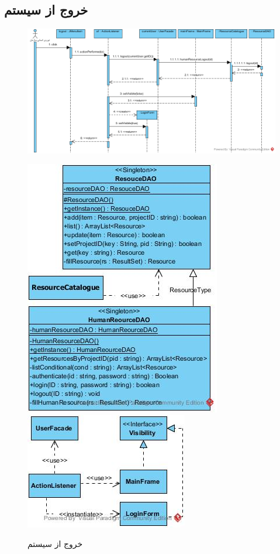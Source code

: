 \begin{landscape}
\section{خروج از سیستم}
\begin{figure}[H]
	\centering
	\includegraphics[scale=0.8]{img/sequence-design/SignOut}
\end{figure}
\begin{figure}[H]
	\centering
	\includegraphics[scale=0.8]{img/sequence-design/SignOutC}
	\includegraphics[scale=0.8]{img/sequence-design/SignOutUI}
	\caption{خروج از سیستم}
\end{figure}


\end{landscape}
